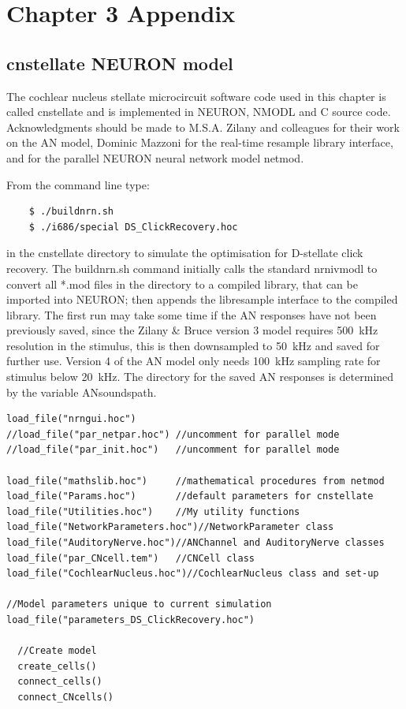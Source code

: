 \graphicspath{{../figures/}{./gfx/}{/media/data/Work/cnstellate/}{/media/data/Work/cnstellate/Responses/}}

\chapter{Chapter 3 Appendix}\label{sec:ch3appendix}
\section{\textsf{cnstellate} NEURON model}

The cochlear nucleus stellate microcircuit software code used in this chapter is
called \textsf{cnstellate} and is implemented in NEURON, NMODL and C source
code. Acknowledgments should be made to M.S.A. Zilany and colleagues for their
work on the AN model, Dominic Mazzoni for the real-time resample library
interface, and \citet{MiglioreCanniaEtAl:2006} for the parallel NEURON
neural network model \textsf{netmod}.

From the command line type:
\begin{verbatim}
    $ ./buildnrn.sh
    $ ./i686/special DS_ClickRecovery.hoc
\end{verbatim}
in the \textsf{cnstellate} directory to simulate the optimisation for D-stellate
click recovery.  The \textsf{buildnrn.sh} command initially calls the standard
\textsf{nrnivmodl} to convert all *.mod files in the directory to a compiled
library, that can be imported into NEURON; then appends the libresample
interface to the compiled library. The 
first run may take some time if the AN
responses have not been previously saved, since the Zilany \& Bruce version 3
model requires 500~kHz resolution in the stimulus, this is then downsampled to
50~kHz and saved for further use. Version 4 of the AN model
\citep{ZilanyBruceEtAl:2009} only needs 100~kHz sampling rate for stimulus below
20~kHz. The directory for the saved AN responses is determined by the variable
\textsf{ANsoundspath}.

\begin{lstlisting}[label=lst:headerlines,caption={Headerlines in
    \mbox{\textsf{DS\_Recover\.hoc}} show a typical setup in a
    \textsf{cnstellate} setup.}]
load_file("nrngui.hoc")
//load_file("par_netpar.hoc") //uncomment for parallel mode
//load_file("par_init.hoc")   //uncomment for parallel mode

load_file("mathslib.hoc")     //mathematical procedures from netmod
load_file("Params.hoc")       //default parameters for cnstellate  
load_file("Utilities.hoc")    //My utility functions 
load_file("NetworkParameters.hoc")//NetworkParameter class
load_file("AuditoryNerve.hoc")//ANChannel and AuditoryNerve classes 
load_file("par_CNcell.tem")   //CNCell class
load_file("CochlearNucleus.hoc")//CochlearNucleus class and set-up

//Model parameters unique to current simulation
load_file("parameters_DS_ClickRecovery.hoc") 

  //Create model
  create_cells()
  connect_cells()
  connect_CNcells()
\end{lstlisting}


